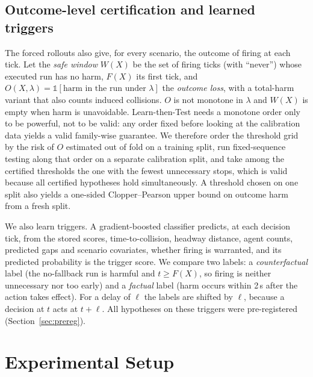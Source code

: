 \documentclass[lettersize,journal]{IEEEtran}
\begin{document}
\subsection{Outcome-level certification and learned triggers}
\label{sec:outcome}
The forced rollouts also give, for every scenario, the outcome of firing at
each tick. Let the \emph{safe window} $W(X)$ be the set of firing ticks
(with ``never'') whose executed run has no harm, $F(X)$ its first tick,
and $O(X,\lambda)=\mathbb{1}[\text{harm in the run under }\lambda]$ the
\emph{outcome loss}, with a total-harm variant that also counts induced
collisions. $O$ is not monotone in $\lambda$ and $W(X)$ is empty when harm
is unavoidable. Learn-then-Test needs a monotone order only to be powerful,
not to be valid: any order fixed before looking at the calibration data
yields a valid family-wise guarantee. We therefore order the threshold
grid by the risk of $O$ estimated out of fold on a training split, run
fixed-sequence testing along that order on a separate calibration split,
and take among the certified thresholds the one with the fewest
unnecessary stops, which is valid because all certified hypotheses hold
simultaneously. A threshold chosen on one split also yields a one-sided
Clopper--Pearson upper bound on outcome harm from a fresh split.

We also learn triggers. A gradient-boosted classifier predicts, at each
decision tick, from the stored scores, time-to-collision, headway distance,
agent counts, predicted gaps and scenario covariates, whether firing is
warranted, and its predicted probability is the trigger score. We compare
two labels: a \emph{counterfactual} label (the no-fallback run is harmful
and $t \ge F(X)$, so firing is neither unnecessary nor too early) and a
\emph{factual} label (harm occurs within 2\,s after the action takes
effect). For a delay of $\ell$ the labels are shifted by $\ell$, because a
decision at $t$ acts at $t+\ell$. All hypotheses on these triggers were
pre-registered (Section~\ref{sec:prereg}).

\section{Experimental Setup}
\label{sec:setup}
\end{document}
